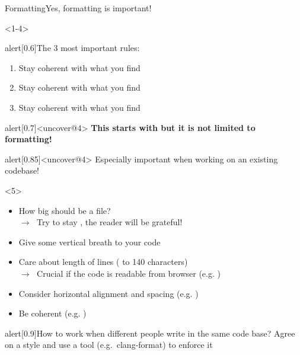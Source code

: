 \begin{frame}{Formatting}{Yes, formatting is important!}
    \begin{onlyenv}<1-4>
        \begin{varblock}{alert}[0.6\textwidth]{The 3 most important rules:}
            \begin{enumerate}[<+(1)->]
                \item Stay coherent with what you find
                \item Stay coherent with what you find
                \item Stay coherent with what you find
            \end{enumerate}
        \end{varblock}
        \vspace{-2mm}
        \begin{varblock}{alert}[0.7\textwidth]{}<uncover@4>
            \textbf{This starts with but it is not limited to formatting!}
        \end{varblock}
        \vspace{-2mm}
        \begin{varblock}{alert}[0.85\textwidth]{}<uncover@4>
            Especially important when working on an existing codebase!
        \end{varblock}
    \end{onlyenv}
    \begin{onlyenv}<5>
        \vspace{-2mm}
        \begin{itemize}
            \item How big should be a file? \\ $\to\;$ Try to stay , the reader will be grateful!
            \item Give some vertical breath to your code
            \item Care about length of lines ( to \alert{140} characters) \\
            $\to\;$ Crucial if the code is readable from browser (e.g. )
            \item Consider horizontal alignment and spacing (e.g. )
            \item Be coherent (e.g. )
        \end{itemize}
        \vspace{-1mm}
        \begin{varblock}{alert}[0.9\textwidth]{How to work when different people write in the same code base?}
            Agree on a style and \alert{use a tool} (e.g.\ clang-format) to enforce it
        \end{varblock}
    \end{onlyenv}
\end{frame}


